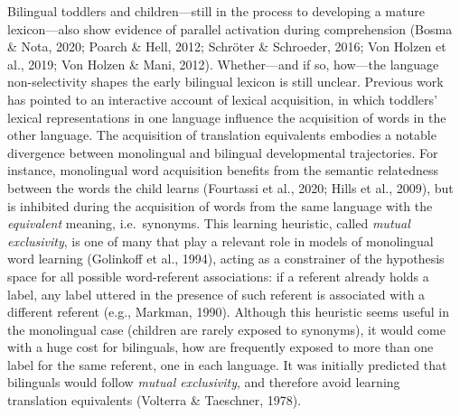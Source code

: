 \documentclass[
  man,
  floatsintext,
  colorlinks=true,linkcolor=blue,citecolor=blue,urlcolor=blue,biblatex]{apa7}
\begin{document}
Bilingual toddlers and children---still in the process to developing a
mature lexicon---also show evidence of parallel activation during
comprehension (Bosma \& Nota, 2020; Poarch \& Hell, 2012; Schröter \&
Schroeder, 2016; Von Holzen et al., 2019; Von Holzen \& Mani, 2012).
Whether---and if so, how---the language non-selectivity shapes the early
bilingual lexicon is still unclear. Previous work has pointed to an
interactive account of lexical acquisition, in which toddlers' lexical
representations in one language influence the acquisition of words in
the other language. The acquisition of translation equivalents embodies
a notable divergence between monolingual and bilingual developmental
trajectories. For instance, monolingual word acquisition benefits from
the semantic relatedness between the words the child learns (Fourtassi
et al., 2020; Hills et al., 2009), but is inhibited during the
acquisition of words from the same language with the \emph{equivalent}
meaning, i.e.~synonyms. This learning heuristic, called \emph{mutual
exclusivity}, is one of many that play a relevant role in models of
monolingual word learning (Golinkoff et al., 1994), acting as a
constrainer of the hypothesis space for all possible word-referent
associations: if a referent already holds a label, any label uttered in
the presence of such referent is associated with a different referent
(e.g., Markman, 1990). Although this heuristic seems useful in the
monolingual case (children are rarely exposed to synonyms), it would
come with a huge cost for bilinguals, how are frequently exposed to more
than one label for the same referent, one in each language. It was
initially predicted that bilinguals would follow \emph{mutual
exclusivity}, and therefore avoid learning translation equivalents
(Volterra \& Taeschner, 1978).
\end{document}
